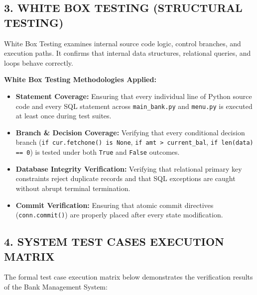 \documentclass[12pt,a4paper]{article}
\begin{document}
\clearpage

\subsection*{3. WHITE BOX TESTING (STRUCTURAL TESTING)}
White Box Testing examines internal source code logic, control branches, and execution paths. It confirms that internal data structures, relational queries, and loops behave correctly.

\vspace{0.6em}
\noindent\textbf{White Box Testing Methodologies Applied:}
\begin{itemize}
    \item \textbf{Statement Coverage:} Ensuring that every individual line of Python source code and every SQL statement across \texttt{main\_bank.py} and \texttt{menu.py} is executed at least once during test suites.
    \item \textbf{Branch \& Decision Coverage:} Verifying that every conditional decision branch (\texttt{if cur.fetchone() is None}, \texttt{if amt > current\_bal}, \texttt{if len(data) == 0}) is tested under both \texttt{True} and \texttt{False} outcomes.
    \item \textbf{Database Integrity Verification:} Verifying that relational primary key constraints reject duplicate records and that SQL exceptions are caught without abrupt terminal termination.
    \item \textbf{Commit Verification:} Ensuring that atomic commit directives (\texttt{conn.commit()}) are properly placed after every state modification.
\end{itemize}

\clearpage

\subsection*{4. SYSTEM TEST CASES EXECUTION MATRIX}
The formal test case execution matrix below demonstrates the verification results of the Bank Management System:
\end{document}
